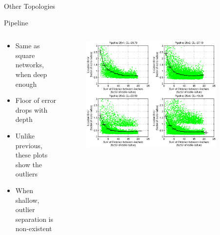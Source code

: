 \documentclass{beamer}
\begin{document}
\begin{frame}{Other Topologies}
\begin{block}{Pipeline}
\begin{columns}
	\begin{column}[T]{0.3\textwidth}
		\begin{itemize}
			\item Same as square networks, when deep enough
			\item Floor of error drops with depth
			\item Unlike previous, these plots show the outliers
			\item When shallow, outlier separation is non-existent
		\end{itemize}
		\vfill
	\end{column}
	\begin{column}[T]{0.7\textwidth}
		\begin{figure}
			\centering
				\includegraphics[width=0.9\textwidth]{pipeline/SumOfDistanceIndicator_pipes}
		\end{figure}
	\end{column}
\end{columns}
\end{block}	
\end{frame}
\end{document}
